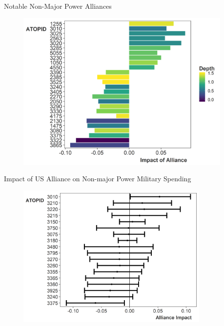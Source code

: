 \documentclass[12pt]{beamer}
\begin{document}

\begin{frame}{Notable Non-Major Power Alliances}


\begin{figure}
	\centering
		\includegraphics[width=0.95\textwidth]{non-zero-min.png}
	\label{fig:non-zero-min}
\end{figure}


\end{frame}



\begin{frame}{Impact of US Alliance on Non-major Power Military Spending} 

\begin{figure}
	\centering
		\includegraphics[width=0.85\textwidth]{lambda-us-min.png}
\end{figure}


\end{frame}
\end{document}
